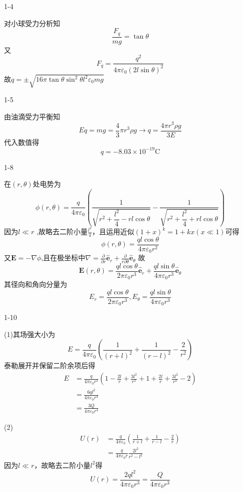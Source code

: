 \documentclass{phyasgn}
\begin{document}
{\heiti\color{red} 1-4}
\begin{sol}
对小球受力分析知
$$\frac{F_q}{mg}=\tan\theta$$
又
$$F_q=\frac{q^2}{4\pi\varepsilon_0(2l\sin\theta)^2}$$
故$q=\pm \sqrt{16\pi\tan\theta\sin^2\theta l^2\varepsilon_0 mg}$
\end{sol}\par
{\heiti\color{red} 1-5}
\begin{sol}
由油滴受力平衡知
$$Eq=mg=\frac{4}{3}\pi r^3\rho g\to q=\frac{4\pi r^3 \rho g}{3E}$$
代入数值得
$$q=-8.03\times 10^{-19}\mathrm{C}$$
\end{sol}\par

{\heiti\color{red} 1-8}
\begin{sol}
在$(r,\theta)$处电势为
$$\phi(r,\theta)=\frac{q}{4\pi\varepsilon_0}(\frac{1}{\sqrt{r^2+\dfrac{l^2}{4}-rl\cos\theta}}
-\frac{1}{\sqrt{r^2+\dfrac{l^2}{4}+rl\cos\theta}})$$
因为$l\ll r$
,故略去二阶小量$\frac{l^2}{4}$，且运用近似$(1+x)^k= 1+kx(x\ll 1)$可得
$$\phi(r,\theta)=\frac{ql\cos\theta}{4\pi \varepsilon_0r^2}$$
又$\mathbf{E}=-\nabla \phi$,且在极坐标中$\nabla=\frac{\partial }{\partial r}\hat{\mathbf{e}}_r+\frac{\partial }{r \partial\theta}
\hat{\mathbf{e}}_\theta$
故
$$\mathbf{E}(r,\theta)=\frac{ql\cos\theta}{2\pi\varepsilon_0r^3}\hat{\mathbf{e}}_r+\frac{ql\sin\theta}{4\pi\varepsilon_0
r^3}\hat{\mathbf{e}}_\theta$$
其径向和角向分量为
$$
E_r=\frac{ql\cos\theta}{2\pi\varepsilon_0r^3},
E_\theta=\frac{ql\sin\theta}{4\pi\varepsilon_0
r^3}
$$
\end{sol}\par
{\heiti\color{red} 1-10}
\begin{sol}
(1)其场强大小为
$$E=\frac{q}{4\pi\varepsilon_0}(\frac{1}{(r+l)^2}+\frac{1}{(r-l)^2}-\frac{2}{r^2})$$
泰勒展开并保留二阶余项后得
$$\begin{aligned}
  E&=\frac{q}{4\pi\varepsilon_0r^2}(1-\frac{2l}{r}+\frac{3l^2}{r^2}+1+\frac{2l}{r}+\frac{3l^2}{r^2}-2)\\
&=\frac{6ql^2}{4\pi\varepsilon_0r^4}\\
&=\frac{3Q}{4\pi\varepsilon_0r^4}
\end{aligned}$$\par
(2)$$\begin{aligned}
  U(r)&=\frac{q}{4\pi\varepsilon_0}(\frac{1}{r+l}+\frac{1}{r-l}-\frac{2}{r})\\
  &=\frac{q}{4\pi\varepsilon_0r}\frac{2l^2}{r^2-l^2}
\end{aligned}$$
因为$l\ll r$，故略去二阶小量$l^2$得
$$U(r)=\frac{2ql^2}{4\pi\varepsilon_0r^3}=\frac{Q}{4\pi\varepsilon_0r^3}$$
\end{sol}\par
\end{document}
